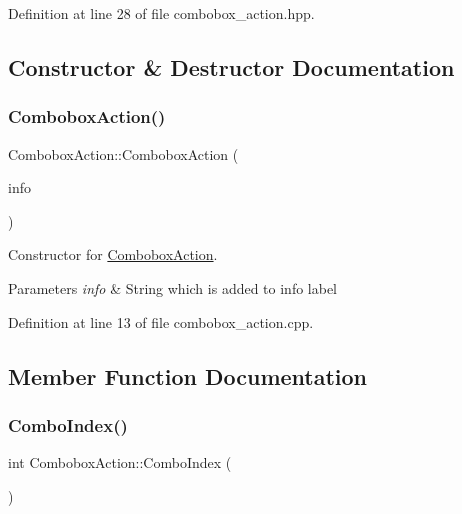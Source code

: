 Definition at line 28 of file combobox\+\_\+action.\+hpp.



\subsection{Constructor \& Destructor Documentation}
\mbox{\label{classComboboxAction_afa2a6bfade094a82beef7d478c5a4cf8}} 
\subsubsection{\texorpdfstring{Combobox\+Action()}{ComboboxAction()}}
{\footnotesize\ttfamily Combobox\+Action\+::\+Combobox\+Action (\begin{DoxyParamCaption}\item[{const Q\+String \&}]{info }\end{DoxyParamCaption})}



Constructor for \mbox{\hyperlink{classComboboxAction}{Combobox\+Action}}. 


\begin{DoxyParams}{Parameters}
{\em info} & String which is added to info label \\
\hline
\end{DoxyParams}


Definition at line 13 of file combobox\+\_\+action.\+cpp.



\subsection{Member Function Documentation}
\mbox{\label{classComboboxAction_adfe475154e5b88eddbc9a51759bdf312}} 
\subsubsection{\texorpdfstring{Combo\+Index()}{ComboIndex()}}
{\footnotesize\ttfamily int Combobox\+Action\+::\+Combo\+Index (\begin{DoxyParamCaption}{ }\end{DoxyParamCaption})}



